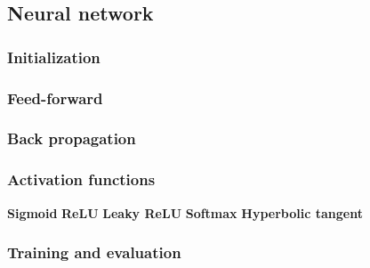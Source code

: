 


\subsection{Neural network}
{


}
\subsubsection{Initialization}

\subsubsection{Feed-forward}

\subsubsection{Back propagation}

\subsubsection{Activation functions}
%
\textbf{Sigmoid}
%
\textbf{ReLU}
%
\textbf{Leaky ReLU}
%
\textbf{Softmax}
%
\textbf{Hyperbolic tangent}
%
\subsubsection{Training and evaluation}







